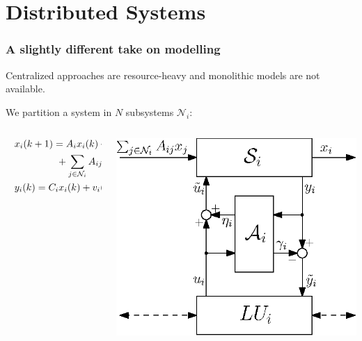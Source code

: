 \documentclass[presentation]{beamer}
\begin{document}
\section{Distributed Systems}

\begin{frame}
	\frametitle{A slightly different take on modelling}

	Centralized approaches are resource-heavy and monolithic models are not available.

	\medskip
	We partition a system in $N$ subsystems $\mathcal N_i$:
	\vfill
	\begin{columns}
		\begin{column}{0.5\linewidth}
			\begin{equation*}
				\hspace*{2ex}
				\begin{aligned}
					&x_i(k+1) = A_{i} x_i(k) + B_i \tilde u_i(k) \\
						&\hspace{10ex} + \sum_{j \in \mathcal{N}_i} A_{ij} x_j(k)  + w_i(k)\\
					&y_i(k) = C_i x_i(k) + v_i(k) 
				\end{aligned}\label{eq:CPS-i}
			\end{equation*}
		\end{column}
		\begin{column}{0.49\linewidth}
			\includegraphics[width=\textwidth]{fig/ndist-obs-generic-ecc.eps}
		\end{column}
	\end{columns}
\end{frame}
\end{document}
